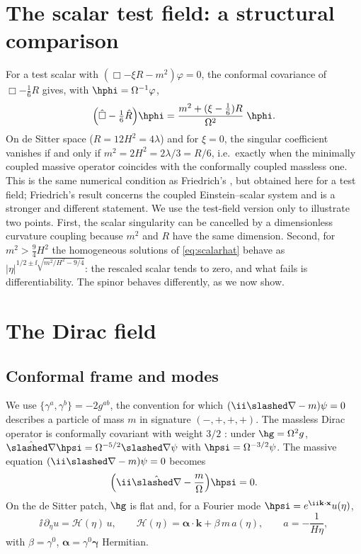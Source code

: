 
\section{The scalar test field: a structural comparison}
\label{sec:scalar}

For a test scalar with $(\Box-\xi R-m^{2})\varphi=0$, the conformal covariance of $\Box-\tfrac16R$ gives, with $\hphi=\Omega^{-1}\varphi$,
\begin{equation}
\Big(\hat\Box-\tfrac16\hat R\Big)\hphi=\frac{m^{2}+(\xi-\tfrac16)R}{\Omega^{2}}\;\hphi .
\label{eq:scalarhat}
\end{equation}
On de Sitter space ($R=12H^{2}=4\lambda$) and for $\xi=0$, the singular coefficient vanishes if and only if $m^{2}=2H^{2}=2\lambda/3=R/6$, i.e.\ exactly when the minimally coupled massive operator coincides with the conformally coupled massless one. This is the same numerical condition as Friedrich's \cite{Friedrich2014}, but obtained here for a test field; Friedrich's result concerns the coupled Einstein--scalar system and is a stronger and different statement. We use the test-field version only to illustrate two points. First, the scalar singularity can be cancelled by a dimensionless curvature coupling because $m^{2}$ and $R$ have the same dimension. Second, for $m^{2}>\tfrac94H^{2}$ the homogeneous solutions of \eqref{eq:scalarhat} behave as $|\eta|^{1/2\pm\ii\sqrt{m^{2}/H^{2}-9/4}}$: the rescaled scalar tends to zero, and what fails is differentiability. The spinor behaves differently, as we now show.

\section{The Dirac field}
\label{sec:dirac}

\subsection{Conformal frame and modes}
\label{sec:modes}

We use $\{\gamma^{a},\gamma^{b}\}=-2g^{ab}$, the convention for which $(\ii\slashed\nabla-m)\psi=0$ describes a particle of mass $m$ in signature $(-,+,+,+)$. The massless Dirac operator is conformally covariant with weight $3/2$ \cite{BirrellDavies,ParkerToms}: under $\hg=\Omega^{2}g$, $\hat{\slashed\nabla}\hpsi=\Omega^{-5/2}\slashed\nabla\psi$ with $\hpsi=\Omega^{-3/2}\psi$. The massive equation $(\ii\slashed\nabla-m)\psi=0$ becomes
\begin{equation}
\Big(\ii\hat{\slashed\nabla}-\frac{m}{\Omega}\Big)\hpsi=0 .
\label{eq:dirachat}
\end{equation}
On the de Sitter patch, $\hg$ is flat and, for a Fourier mode $\hpsi=e^{\ii\mathbf{k}\cdot\mathbf{x}}u(\eta)$,
\begin{equation}
\ii\,\partial_{\eta}u=\mathcal{H}(\eta)\,u,\qquad \mathcal{H}(\eta)=\boldsymbol\alpha\cdot\mathbf{k}+\beta\,m\,a(\eta),\qquad a=-\frac{1}{H\eta},
\label{eq:hk}
\end{equation}
with $\beta=\gamma^{0}$, $\boldsymbol\alpha=\gamma^{0}\boldsymbol\gamma$ Hermitian.

